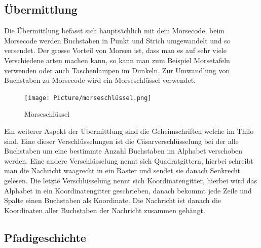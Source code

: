 \subsection*{Übermittlung}
Die Übermittlung befasst sich hauptsächlich mit dem Morsecode, beim Morsecode werden Buchstaben in Punkt und Strich umgewandelt und so versendet. Der grosse Vorteil von Morsen ist, dass man es auf sehr viele Verschiedene arten machen kann, so kann man zum Beispiel Morsetafeln verwenden oder auch Taschenlampen im Dunkeln. Zur Umwandlung von Buchstaben zu Morsecode wird ein Morseschlüssel verwendet.
\begin{figure}
    \centering
    \texttt{[image: Picture/morseschlüssel.png]}
    \caption{Morseschlüssel}
\end{figure}
\par
Ein weiterer Aspekt der Übermittlung sind die Geheimschriften welche im Thilo \cite{noauthor_thilo_2014} sind. Eine dieser Verschlüsselungen ist die Cäsarverschlüsselung bei der alle Buchstaben um eine bestimmte Anzahl Buchstaben im Alphabet verschoben werden. Eine andere Verschlüsselung nennt sich Quadratgittern, hierbei schreibt man die Nachricht waagrecht in ein Raster und sendet sie danach Senkrecht gelesen. Die letzte Verschlüsselung nennt sich Koordinatengitter, hierbei wird das Alphabet in ein Koordinatengitter geschrieben, danach bekommt jede Zeile und Spalte einen Buchstaben als Koordinate. Die Nachricht ist danach die Koordinaten aller Buchstaben der Nachricht zusammen gehängt.

\subsection*{Pfadigeschichte}
